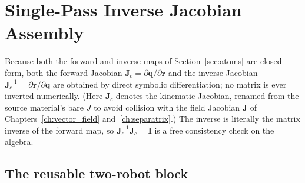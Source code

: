 \documentclass[12pt, letterpaper, oneside]{report}
\begin{document}

\section{Single-Pass Inverse Jacobian Assembly}
\label{sec:assembly}

Because both the forward and inverse maps of Section~\ref{sec:atoms} are
closed form, both the forward Jacobian $\mathbf{J}_c=\partial\mathbf{q}/\partial\mathbf{r}$
and the inverse Jacobian $\mathbf{J}_c^{-1}=\partial\mathbf{r}/\partial\mathbf{q}$
are obtained by direct symbolic differentiation; no matrix is ever inverted
numerically. (Here $\mathbf{J}_c$ denotes the kinematic Jacobian, renamed
from the source material's bare $J$ to avoid collision with the field
Jacobian $\mathbf{J}$ of Chapters~\ref{ch:vector_field}
and~\ref{ch:separatrix}.) The inverse is literally the matrix inverse of the
forward map, so $\mathbf{J}_c^{-1}\mathbf{J}_c=\mathbf{I}$ is a free
consistency check on the algebra.

\subsection{The reusable two-robot block}
\end{document}
